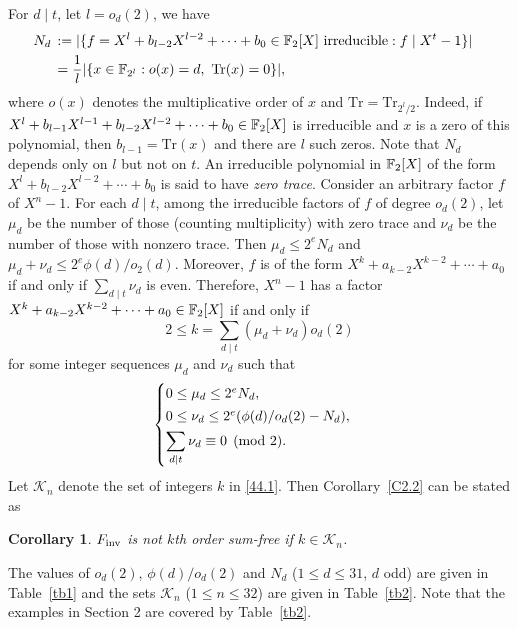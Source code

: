 \documentclass{amsart}
\newtheorem{cor}[thm]{Corollary}
\numberwithin{equation}{section}
\theoremstyle{definition}
\newcommand{\f}{\Bbb F}
\newcommand{\fin}{F_{\text{\rm inv}}}
\begin{document}
For $d\mid t$, let $l=o_d(2)$, we have
\begin{align*}
N_d\,&:=|\{f=X^l+b_{l-2}X^{l-2}+\cdots+b_0\in\f_2[X]\ \text{irreducible}:f\mid X^t-1\}|\cr
&=\frac 1l|\{x\in\f_{2^l}:o(x)=d,\ \text{Tr}(x)=0\}|,
\end{align*}
where $o(x)$ denotes the multiplicative order of $x$ and $\text{Tr}=\text{Tr}_{2^l/2}$. Indeed, if $X^l+b_{l-1}X^{l-1}+b_{l-2}X^{l-2}+\cdots+b_0\in\f_2[X]$ is irreducible and $x$ is a zero of this polynomial, then $b_{l-1}=\text{Tr}(x)$ and there are $l$ such zeros. Note that $N_d$ depends only on $l$ but not on $t$. 
An irreducible polynomial in $\f_2[X]$ of the form $X^l+b_{l-2}X^{l-2}+\cdots+b_0$ is said to have {\em zero trace}. Consider an arbitrary factor $f$ of $X^n-1$. For each $d\mid t$, among the irreducible factors of $f$ of degree $o_d(2)$, let $\mu_d$ be the number of those (counting multiplicity) with zero trace and $\nu_d$ be the number of those with nonzero trace. Then $\mu_d\le 2^eN_d$ and $\mu_d+\nu_d\le 2^e\phi(d)/o_2(d)$. Moreover, $f$ is of the form $X^k+a_{k-2}X^{k-2}+\cdots+a_0$ if and only if $\sum_{d\mid t}\nu_d$ is even. Therefore, $X^n-1$ has a factor $X^k+a_{k-2}X^{k-2}+\cdots+a_0\in\f_2[X]$ if and only if
\begin{equation}\label{44.1}
2\le k=\sum_{d\mid t}(\mu_d+\nu_d)o_d(2)
\end{equation}
for some integer sequences $\mu_d$ and $\nu_d$ such that 
\[
\begin{cases}
0\le\mu_d\le 2^eN_d,\vspace{0.2em}\cr
0\le\nu_d\le 2^e(\phi(d)/o_d(2)-N_d),\vspace{0.3em}\cr
\displaystyle\sum_{d\mid t}\nu_d\equiv 0\pmod 2.
\end{cases}
\]
Let $\mathcal K_n$ denote the set of integers $k$ in \eqref{44.1}. Then Corollary~\ref{C2.2} can be stated as

\begin{cor}\label{C4.1}
$\fin$ is not $k$th order sum-free if $k\in\mathcal K_n$.
\end{cor}

The values of $o_d(2)$, $\phi(d)/o_d(2)$ and $N_d$ ($1\le d\le 31$, $d$ odd) are given in Table~\ref{tb1} and the sets $\mathcal K_n$ ($1\le n\le 32$) are given in Table~\ref{tb2}. Note that the examples in Section 2 are covered by Table~\ref{tb2}.
\end{document}
